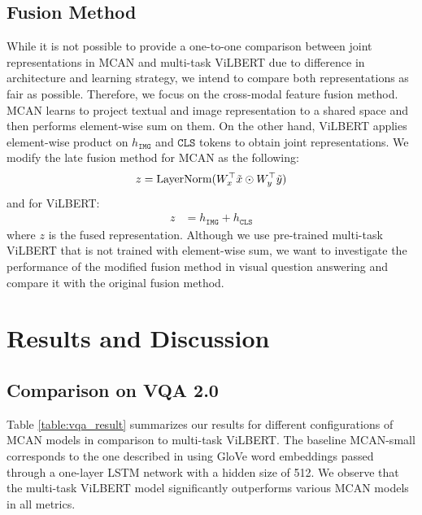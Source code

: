 \documentclass{article}
\begin{document}


\subsection{Fusion Method}
While it is not possible to provide a one-to-one comparison between joint representations in MCAN and multi-task ViLBERT due to difference in architecture and learning strategy, we intend to compare both representations as fair as possible. Therefore, we focus on the cross-modal feature fusion method. MCAN learns to project textual and image representation to a shared space and then performs element-wise sum on them. On the other hand, ViLBERT applies element-wise product on $h_{\mathtt{IMG}}$ and $\mathtt{CLS}$ tokens to obtain joint representations. We modify the late fusion method for MCAN as the following:
\begin{align}
    z &= \text{LayerNorm}(W^{\top}_{x}\Tilde{x} \odot W^{\top}_{y}\Tilde{y}) \\
\end{align}
and for ViLBERT:
\begin{align}
    z &= h_{\mathtt{IMG}} + h_{\mathtt{CLS}}
\end{align}
where $z$ is the fused representation. Although we use pre-trained multi-task ViLBERT that is not trained with element-wise sum, we want to investigate the performance of the modified fusion method in visual question answering and compare it with the original fusion method. 

\section{Results and Discussion}
\subsection{Comparison on VQA 2.0} \label{comp_vqa}
Table \ref{table:vqa_result} summarizes our results for different configurations of MCAN models in comparison to multi-task ViLBERT. The baseline MCAN-small corresponds to the one described in \cite{yu2019mcan} using GloVe word embeddings passed through a one-layer LSTM network with a hidden size of 512. We observe that the multi-task ViLBERT model significantly outperforms various MCAN models in all metrics.
\end{document}
